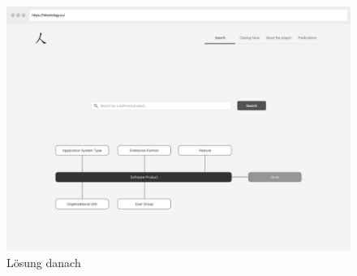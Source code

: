 \begin{enumerate}
\clearpage

\begin{figure}[H]
	\centering
    	\includegraphics[width=1.45\textwidth, angle=-90]{Images/Startseite}
   	\caption{Lösung danach}
   	\label{fig:wireframe_start}
\end{figure}

\clearpage

\end{enumerate}
